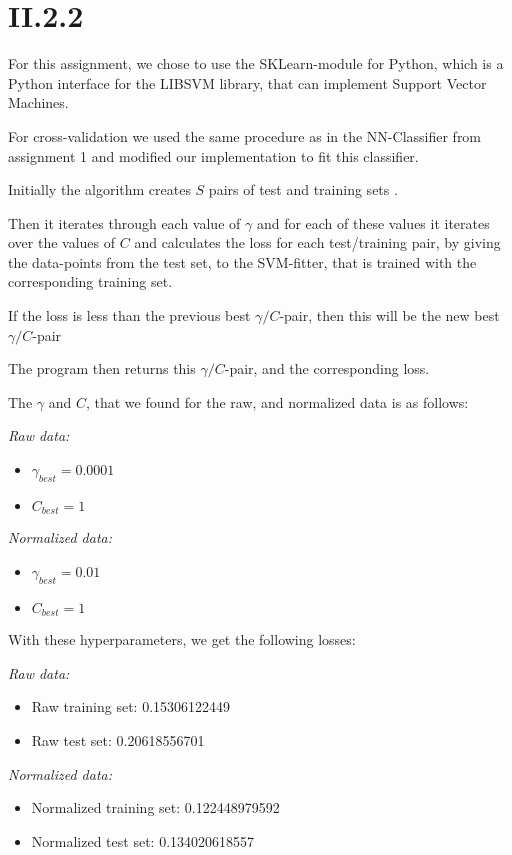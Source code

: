 \documentclass[12pt, a4paper]{article}
\begin{document}
\section*{II.2.2}
For this assignment, we chose to use the SKLearn-module for Python, which is a Python interface for the LIBSVM library, that can implement Support Vector Machines.

For cross-validation we used the same procedure as in the NN-Classifier from assignment 1 and modified our implementation to fit this classifier.

Initially the algorithm creates $S$ pairs of test and training sets .

Then it iterates through each value of $\gamma$ and for each of these values it iterates over the values of $C$ and calculates the loss for each test/training pair, by giving the data-points from the test set, to the SVM-fitter, that is trained with the corresponding training set.

If the loss is less than the previous best $\gamma/C$-pair, then this will be the new best $\gamma/C$-pair

The program then returns this $\gamma/C$-pair, and the corresponding loss.

The $\gamma$ and $C$, that we found for the raw, and normalized data is as follows:

\textit{Raw data:}
\begin{itemize}
	\item $\gamma_{best} = 0.0001$
	\item $C_{best} = 1$
\end{itemize}

\textit{Normalized data:}
\begin{itemize}
	\item $\gamma_{best} = 0.01$
	\item $C_{best} = 1$
\end{itemize}

With these hyperparameters, we get the following losses:

\textit{Raw data:}
\begin{itemize}
	\item Raw training set: 0.15306122449
	\item Raw test set: 0.20618556701
\end{itemize}

\textit{Normalized data:}
\begin{itemize}
	\item Normalized training set: 0.122448979592
	\item Normalized test set: 0.134020618557
\end{itemize}
\end{document}
